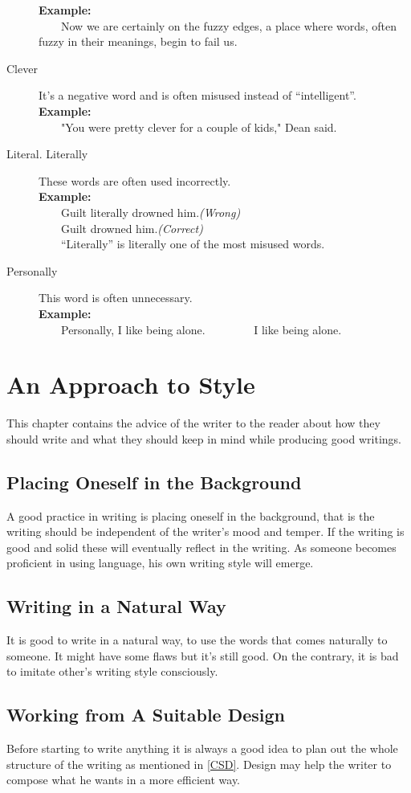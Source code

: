 \documentclass[12pt]{report}
\newcommand{\xmpl}{\textbf{Example:}\\} %
\newcommand{\indnt}{\ \ \ \ } %
\begin{document}
\begin{description}
	\xmpl
	\indnt Now we are certainly on the fuzzy edges, a place where words, often fuzzy in their meanings, begin to fail us.
	\item[Clever] It's a negative word and is often misused instead of ``intelligent''.\\
	\xmpl
	\indnt "You were pretty clever for a couple of kids," Dean said.
	\item[Literal. Literally] These words are often used incorrectly.\\
	\xmpl
	\indnt Guilt literally drowned him.\textit{(Wrong)}\\
	\indnt Guilt drowned him.\textit{(Correct)}\\
	\indnt ``Literally'' is literally one of the most misused words.
	\item[Personally] This word is often unnecessary.\\
	\xmpl
	\indnt Personally, I like being alone. \indnt \indnt I like being alone.
\end{description}


\chapter{An Approach to Style}
This chapter contains the advice of the writer to the reader about how they should write and what they should keep in mind while producing good writings.


\section{Placing Oneself in the Background}
A good practice in writing is placing oneself in the background, that is the writing should be independent of the writer's mood and temper. If the writing is good and solid these will eventually reflect in the writing. As someone becomes proficient in using language, his own writing style will emerge.


\section{Writing in a Natural Way}
It is good to write in a natural way, to use the words that comes naturally to someone. It might have some flaws but it's still good. On the contrary, it is bad to imitate other's writing style consciously.


\section{Working from A Suitable Design}
Before starting to write anything it is always a good idea to plan out the whole structure of the writing as mentioned in \ref{CSD}. Design may help the writer to compose what he wants in a more efficient way.
\end{document}
